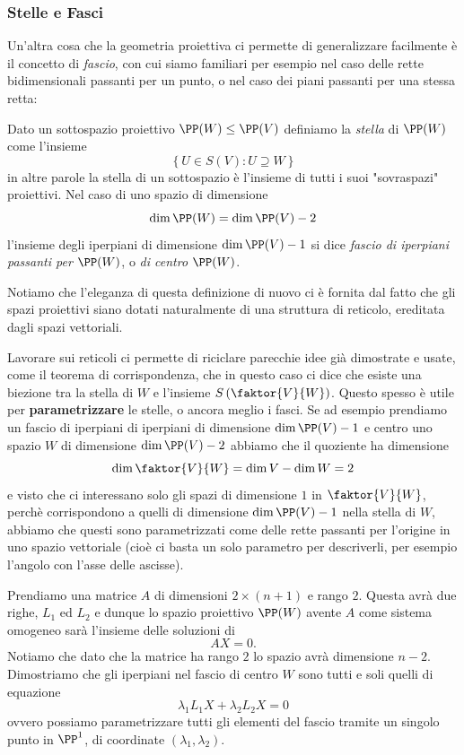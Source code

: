 \documentclass[11pt]{scrartcl}
\begin{document}
   	 \subsubsection{Stelle e Fasci} 
   	 Un'altra cosa che la geometria proiettiva ci permette di generalizzare facilmente è il concetto di \textit{fascio}, con cui siamo familiari per esempio nel caso delle rette bidimensionali passanti per un punto, o nel caso dei piani passanti per una stessa retta:
   	 \begin{definition}
   	 	Dato un sottospazio proiettivo $\PP(W)\le \PP(V)$ definiamo la \textit{stella} di $\PP(W)$ come l'insieme
   	 	$$\left\{U\in S(V):U\supseteq W\right\}$$
   	 	in altre parole la stella di un sottospazio è l'insieme di tutti i suoi "sovraspazi" proiettivi. Nel caso di uno spazio di dimensione
   	 	$$\dim\PP(W)=\dim\PP(V)-2$$
   	 	l'insieme degli iperpiani di dimensione $\dim \PP(V)-1$ si dice \textit{fascio di iperpiani passanti per $\PP(W)$}, o \textit{di centro} $\PP(W)$.
   	 \end{definition}
   	 Notiamo che l'eleganza di questa definizione di nuovo ci è fornita dal fatto che gli spazi proiettivi siano dotati naturalmente di una struttura di reticolo, ereditata dagli spazi vettoriali.
   	 \begin{remark}
   	 	Lavorare sui reticoli ci permette di riciclare parecchie idee già dimostrate e usate, come il teorema di corrispondenza, che in questo caso ci dice che esiste una biezione tra la stella di $W$ e l'insieme $S\left(\faktor{V}{W}\right)$. Questo spesso è utile per \textbf{parametrizzare} le stelle, o ancora meglio i fasci. Se ad esempio prendiamo un fascio di iperpiani di iperpiani di dimensione $\dim \PP(V) -1$ e centro uno spazio $W$ di dimensione $\dim \PP(V)-2$ abbiamo che il quoziente ha dimensione
   	 	$$\dim\faktor{V}{W}=\dim V-\dim W=2$$
   	 	e visto che ci interessano solo gli spazi di dimensione $1$ in $\faktor{V}{W}$, perchè corrispondono a quelli di dimensione $\dim \PP(V)-1$ nella stella di $W$, abbiamo che questi sono parametrizzati come delle rette passanti per l'origine in uno spazio vettoriale (cioè ci basta un solo parametro per descriverli, per esempio l'angolo con l'asse delle ascisse).
   	 \end{remark}
   	 \begin{example}
   	 	Prendiamo una matrice $A$ di dimensioni $2\times(n+1)$ e rango $2$. Questa avrà due righe, $L_1$ ed $L_2$ e dunque lo spazio proiettivo $\PP(W)$ avente $A$ come sistema omogeneo sarà l'insieme delle soluzioni di
   	 	$$AX=0.$$
   	 	Notiamo che dato che la matrice ha rango $2$ lo spazio avrà dimensione $n-2$. Dimostriamo che gli iperpiani nel fascio di centro $W$ sono tutti e soli quelli di equazione
   	 	$$\lambda_1L_1X+\lambda_2L_2X=0$$
   	 	ovvero possiamo parametrizzare tutti gli elementi del fascio tramite un singolo punto in $\PP^1$, di coordinate $(\lambda_1,\lambda_2)$.
   	 \end{example} 
\end{document}
